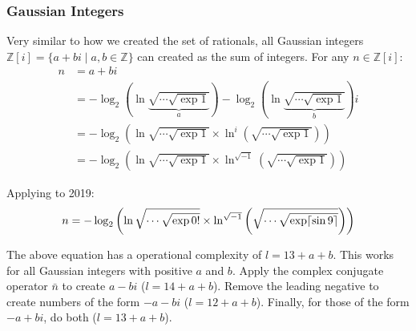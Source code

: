 \subsubsection{Gaussian Integers}
Very similar to how we created the set of rationals, all Gaussian integers $\mathbb{Z}[i]=\{a+bi\mid a,b\in\mathbb{Z}\}$ can created as the sum of integers. For any $n\in\mathbb{Z}[i]$:
\begin{align*}
  n &= a + bi \\
  &= -\log_2\left(
      \ln \underbrace{\sqrt{\cdots\sqrt{\exp1}}}_{a} 
    \right) -
    \log_2\left(
      \ln \underbrace{\sqrt{\cdots\sqrt{\exp1}}}_{b} 
    \right)i \\
  &= -\log_2\left(
      \ln \sqrt{\cdots\sqrt{\exp1}}
      \times
      \ln^i \left(\sqrt{\cdots\sqrt{\exp1}}\right)
    \right) \\
  &= -\log_2\left(
      \ln \sqrt{\cdots\sqrt{\exp1}}
      \times
      \ln^{\sqrt{-1}} \left(\sqrt{\cdots\sqrt{\exp1}}\right)
    \right)
\end{align*}

Applying to 2019:
\begin{equation}
  n = -\log_2\left(
    \ln \sqrt{\cdots\sqrt{\exp0!}}
    \times
    \ln^{\sqrt{-1}} \left(
      \sqrt{\cdots\sqrt{\exp\lceil\sin9\rceil}}
    \right)
  \right)
\end{equation}

The above equation has a operational complexity of $l=13+a+b$.
This works for all Gaussian integers with positive $a$ and $b$.
Apply the complex conjugate operator $\bar{n}$ to create $a-bi$ ($l=14+a+b$).
Remove the leading negative to create numbers of the form $-a-bi$ ($l=12+a+b$).
Finally, for those of the form $-a+bi$, do both ($l=13+a+b$).

